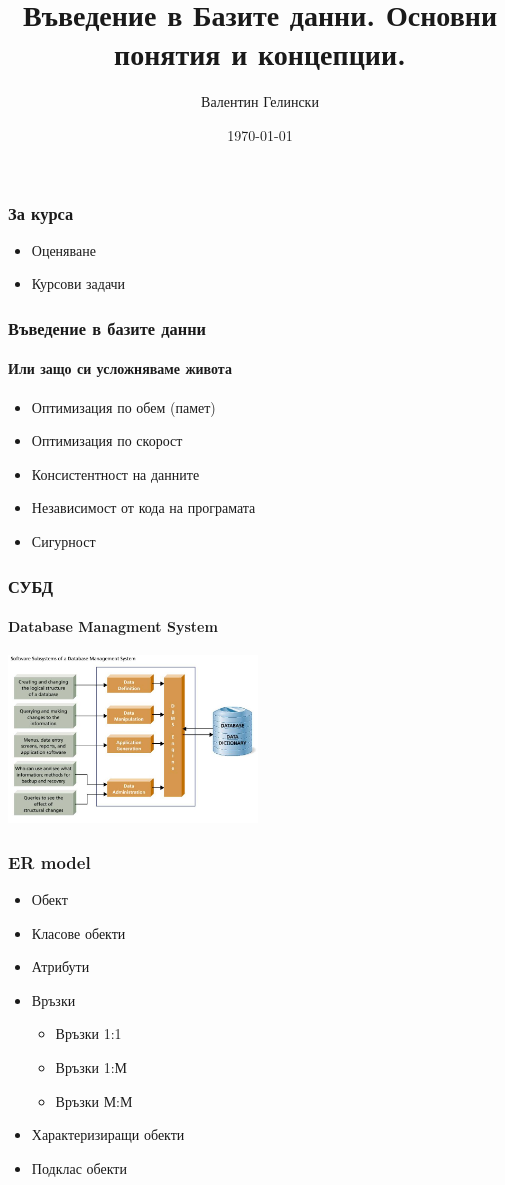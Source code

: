 \documentclass{beamer}
\title{Въведение в Базите данни. Основни понятия и концепции.}
\author{Валентин Гелински}
\institute{ТУ София}
\date{\today}
\begin{document}
  \begin{frame} 
    \titlepage
  \end{frame}

  \begin{frame}
    \frametitle{За курса}
    \begin{itemize}
      \item{Оценяване}
      \item{Курсови задачи}
    \end{itemize}
  \end{frame}

  \begin{frame}
    \frametitle{Въведение в базите данни}
    \framesubtitle{Или защо си усложняваме живота}
    \begin{itemize}
      \item{Оптимизация по обем (памет)}
      \item{Оптимизация по скорост}
      \item{Консистентност на данните}
      \item{Независимост от кода на програмата}
      \item{Сигурност}
    \end{itemize}
  \end{frame}

  \begin{frame}
    \frametitle{СУБД}
    \framesubtitle{Database Managment System}
    \includegraphics[width=250px]{img/rdbms}
  \end{frame}

  \begin{frame}
    \frametitle{ER model}
    \begin{itemize}
      \item{Обект}
      \item{Класове обекти}
      \item{Атрибути}
      \item{Връзки}
      \begin{itemize}
        \item{Връзки 1:1}
        \item{Връзки 1:М}
        \item{Връзки М:М}
      \end{itemize}
      \item{Характеризиращи обекти}
      \item{Подклас обекти}
    \end{itemize}
  \end{frame}
\end{document}
